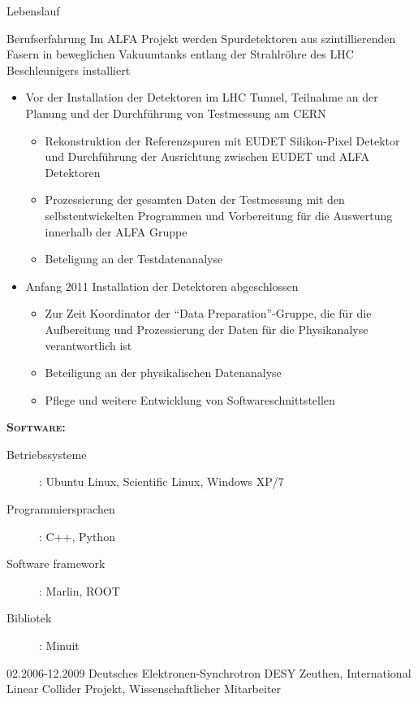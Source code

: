 \documentclass[11pt,a4paper]{scrartcl}
\begin{document}
\begin{cv}{Lebenslauf}
\begin{cvlist}{Berufserfahrung}
Im ALFA Projekt werden Spurdetektoren aus szintillierenden Fasern
in beweglichen Vakuumtanks entlang der Strahlr{\"o}hre des LHC
Beschleunigers installiert
\begin{itemize}
  \item Vor der Installation der Detektoren im LHC Tunnel, Teilnahme
  an der Planung und der Durchf{\"u}hrung von Testmessung am CERN
  \begin{itemize}
    \item Rekonstruktion der Referenzspuren mit EUDET Silikon-Pixel
    Detektor und Durchf{\"u}hrung der Ausrichtung zwischen EUDET
    und ALFA Detektoren
    \item Prozessierung der gesamten Daten der Testmessung mit den
    selbstentwickelten Programmen und Vorbereitung f{\"u}r die
    Auswertung innerhalb der ALFA Gruppe
    \item Beteligung an der Testdatenanalyse
  \end{itemize}
  \item Anfang 2011 Installation der Detektoren abgeschlossen
  \begin{itemize}
    \item Zur Zeit Koordinator der "`Data Preparation"'-Gruppe, die
    f{\"u}r die Aufbereitung und Prozessierung der Daten f{\"u}r
    die Physikanalyse verantwortlich ist
    \item Beteiligung an der physikalischen Datenanalyse
    \item Pflege und weitere Entwicklung von Softwareschnittstellen
  \end{itemize}
\end{itemize}

{\scshape {\bfseries Software:}}
\begin{description}
\item[Betriebssysteme] : Ubuntu Linux, Scientific Linux, Windows
XP/7
\item[Programmiersprachen] : C++, Python
\item[Software framework] : Marlin, ROOT
\item[Bibliotek] : Minuit
\end{description}

\vspace{\baselineskip}

\item[02.2006-12.2009] Deutsches Elektronen-Synchrotron DESY Zeuthen,
International Linear Collider Projekt, Wissenschaftlicher Mitarbeiter \\


\end{cvlist}
\end{cv}
\end{document}
